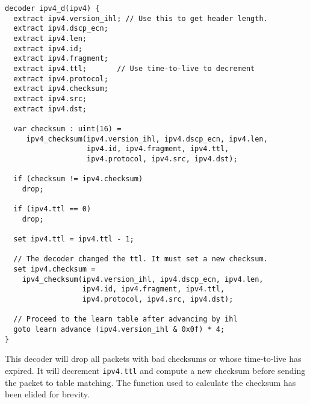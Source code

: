 \begin{codepage}
\begin{lstlisting}
decoder ipv4_d(ipv4) {
  extract ipv4.version_ihl; // Use this to get header length.
  extract ipv4.dscp_ecn;
  extract ipv4.len;
  extract ipv4.id;
  extract ipv4.fragment;
  extract ipv4.ttl;       // Use time-to-live to decrement
  extract ipv4.protocol;
  extract ipv4.checksum;
  extract ipv4.src;
  extract ipv4.dst;

  var checksum : uint(16) =
     ipv4_checksum(ipv4.version_ihl, ipv4.dscp_ecn, ipv4.len, 
                   ipv4.id, ipv4.fragment, ipv4.ttl, 
                   ipv4.protocol, ipv4.src, ipv4.dst);

  if (checksum != ipv4.checksum)
    drop;

  if (ipv4.ttl == 0)
    drop;

  set ipv4.ttl = ipv4.ttl - 1;

  // The decoder changed the ttl. It must set a new checksum.
  set ipv4.checksum =
    ipv4_checksum(ipv4.version_ihl, ipv4.dscp_ecn, ipv4.len, 
                  ipv4.id, ipv4.fragment, ipv4.ttl, 
                  ipv4.protocol, ipv4.src, ipv4.dst);

  // Proceed to the learn table after advancing by ihl
  goto learn advance (ipv4.version_ihl & 0x0f) * 4;
}
\end{lstlisting}
\end{codepage}

This decoder will drop all packets with bad checksums or whose time-to-live has 
expired. It will decrement \texttt{ipv4.ttl} and compute a new checksum before 
sending the packet to table matching. The function used to calculate the checksum
has been elided for brevity.

%
%
%
%
%


